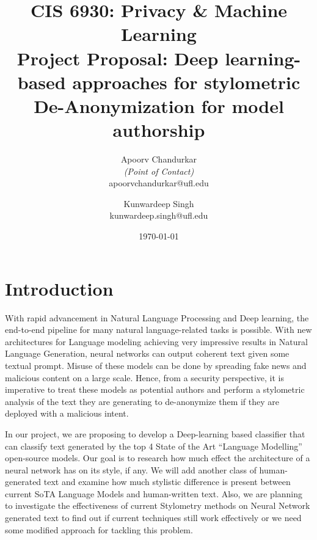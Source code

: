 \documentclass[11pt,letterpaper]{article}
\title{CIS 6930: Privacy \& Machine Learning\\
	\large Project Proposal: Deep learning-based approaches for stylometric De-Anonymization for model authorship} %
\author{
        Apoorv Chandurkar \\{\em (Point of Contact)} \\
        apoorvchandurkar@ufl.edu\\
        \and
        Kunwardeep Singh \\
        kunwardeep.singh@ufl.edu\\
}
\date{\today}
\begin{document}

\maketitle




\section{Introduction}

With rapid advancement in Natural Language Processing and Deep learning, the end-to-end pipeline for many natural language-related tasks is possible. With new architectures for Language modeling achieving very impressive results in Natural Language Generation, neural networks can output coherent text given some textual prompt. Misuse of these models can be done by spreading fake news and malicious content on a large scale. Hence, from a security perspective, it is imperative to treat these models as potential authors and perform a stylometric analysis of the text they are generating to de-anonymize them if they are deployed with a malicious intent. 
\par In our project, we are proposing to develop a Deep-learning based classifier that can classify text generated by the top 4 State of the Art “Language Modelling” open-source models. Our goal is to research how much effect the architecture of a neural network has on its style, if any. We will add another class of human-generated text and examine how much stylistic difference is present between current SoTA Language Models and human-written text. Also, we are planning to investigate the effectiveness of current Stylometry methods on Neural Network generated text to find out if current techniques still work effectively or we need some modified approach for tackling this problem.



\end{document}

